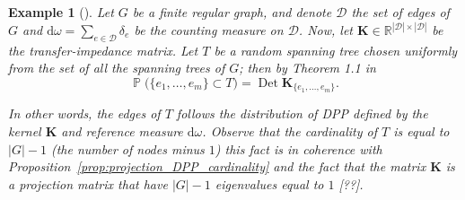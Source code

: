 \documentclass[twoside,11pt]{book}
\newtheorem{example}{Example}
\numberwithin{theorem}{chapter}
\numberwithin{definition}{chapter}
\numberwithin{proposition}{chapter}
\numberwithin{corollary}{chapter}
\numberwithin{example}{chapter}
\numberwithin{lemma}{chapter}
\numberwithin{assumption}{chapter}
\numberwithin{equation}{chapter}
\numberwithin{figure}{chapter}
\DeclareMathOperator{\Det}{Det}
\DeclareMathOperator{\Prb}{\mathbb{P}}
\begin{document}
\begin{example}[\cite{BuPe93}]
Let $G$ be a finite regular graph, and denote $\mathcal{D}$ the set of edges of $G$ and $\mathrm{d}\omega = \sum_{e \in \mathcal{D}} \delta_{e}$ be the counting measure on $\mathcal{D}$. Now, let $\bm{K} \in \mathbb{R}^{|\mathcal{D}| \times |\mathcal{D}|}$ be the transfer-impedance matrix. Let $T$ be a random spanning tree chosen uniformly from the
set of all the spanning trees of $G$; then by Theorem 1.1 in \cite{BuPe93}
\begin{equation}
\Prb \Big( \{e_{1}, \dots , e_{m} \} \subset T \Big) = \Det \bm{K}_{\{e_{1}, \dots , e_{m}\}}.
\end{equation}

In other words, the edges of $T$ follows the distribution of DPP defined by the kernel $\bm{K}$ and reference measure $\mathrm{d}\omega$. Observe that the cardinality of $T$ is equal to $|G|-1$ (the number of nodes minus $1$) this fact is in coherence with Proposition~\ref{prop:projection_DPP_cardinality} and the fact that the matrix $\bm{K}$ is a projection matrix that have $|G|-1$ eigenvalues equal to $1$ [??]. 





\end{example}



\end{document}
